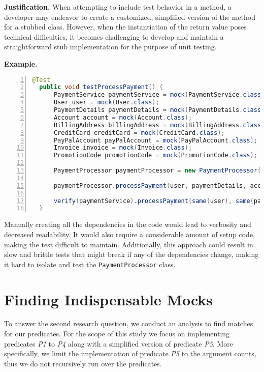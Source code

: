 \documentclass[conference]{IEEEtran}
\begin{document}
\textbf{Justification. }
When attempting to include test behavior in a method, a developer may endeavor to create a customized, simplified version of the method for a stubbed class. However, when the instantiation of the return value poses technical difficulties, it becomes challenging to develop and maintain a straightforward stub implementation for the purpose of unit testing.

\textbf{Example. }
\begin{lstlisting}[basicstyle=\ttfamily,
numbers=left,numbersep=0pt,basicstyle=\scriptsize\ttfamily,language = Java, framesep=4.5mm, framexleftmargin=1.0mm, captionpos=b, escapechar=|, morekeywords={@Test}]
  @Test
  public void testProcessPayment() {
      PaymentService paymentService = mock(PaymentService.class);
      User user = mock(User.class);
      PaymentDetails paymentDetails = mock(PaymentDetails.class);
      Account account = mock(Account.class);
      BillingAddress billingAddress = mock(BillingAddress.class);
      CreditCard creditCard = mock(CreditCard.class);
      PayPalAccount payPalAccount = mock(PayPalAccount.class);
      Invoice invoice = mock(Invoice.class);
      PromotionCode promotionCode = mock(PromotionCode.class);
      
      PaymentProcessor paymentProcessor = new PaymentProcessor(paymentService);
      
      paymentProcessor.processPayment(user, paymentDetails, account, billingAddress, creditCard, payPalAccount, invoice, promotionCode);
      
      verify(paymentService).processPayment(same(user), same(paymentDetails), same(account), same(billingAddress), same(creditCard), same(payPalAccount), same(invoice),  same(promotionCode));
  }
\end{lstlisting}

Manually creating all the dependencies in the code would lead to verbosity and decreased readability. It would also require a considerable amount of setup code, making the test difficult to maintain. Additionally, this approach could result in slow and brittle tests that might break if any of the dependencies change, making it hard to isolate and test the \texttt{PaymentProcessor} class.

\section{Finding Indispensable Mocks}
To answer the second research question, we conduct an analysis to find matches for our predicates. For the scope of this study we focus on implementing predicates \textit{P1} to \textit{P4} along with a simplified version of predicate \textit{P5}. More specifically, we limit the implementation of predicate \textit{P5} to the argument counts, thus we do not recursively run over the predicates.
\end{document}
